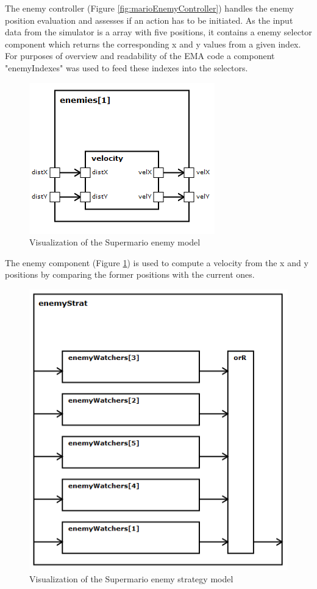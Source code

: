 The enemy controller (Figure \ref{fig:marioEnemyController}) handles the enemy position evaluation and assesses if an action has to be initiated. As the input data from the simulator is a array with five positions, it contains a enemy selector component which returns the corresponding x and y values from a given index. For purposes of overview and readability of the EMA code a component "enemyIndexes" was used to feed these indexes into the selectors.

\begin{figure}
	\centering
	\includegraphics[scale=0.5]{pictures/haller_enemy.PNG}
	\caption{Visualization of the Supermario enemy model}
	\label{fig:marioEnemy}
\end{figure}

The enemy component (Figure \ref{fig:marioEnemy}) is used to compute a velocity from the x and y positions by comparing the former positions with the current ones.

\begin{figure}
	\centering
	\includegraphics[scale=0.4]{pictures/haller_enemystrategy.PNG}
	\caption{Visualization of the Supermario enemy strategy model}
	\label{fig:marioEnemyStrategy}
\end{figure}

